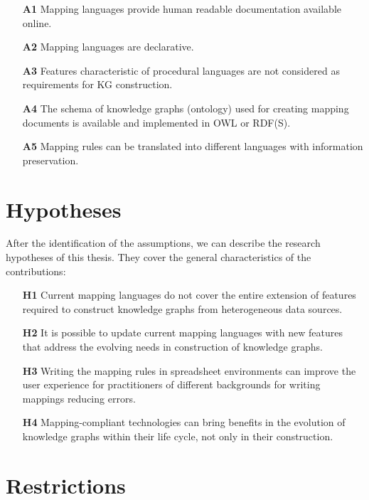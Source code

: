 \begin{enumerate}
    \item[\textbf{A1}] Mapping languages provide human readable documentation available online.
    \item[\textbf{A2}] Mapping languages are declarative.
    \item[\textbf{A3}] Features characteristic of procedural languages are not considered as requirements for KG construction. 
    \item[\textbf{A4}] The schema of knowledge graphs (ontology) used for creating mapping documents is available and implemented in OWL or RDF(S). 
    \item[\textbf{A5}] Mapping rules can be translated into different languages with information preservation.
\end{enumerate}


\section{Hypotheses}
\label{sec:chp3-hypotheses}

After the identification of the assumptions, we can describe the research hypotheses  of this thesis. They cover the general characteristics of the contributions:

\begin{enumerate}
    \item[\textbf{H1}] Current mapping languages do not cover the entire extension of features required to construct knowledge graphs from heterogeneous data sources.
    \item[\textbf{H2}] It is possible to update  current mapping languages with new features that address the evolving needs in construction of knowledge graphs.
    \item[\textbf{H3}] Writing the mapping rules in spreadsheet environments can improve the user experience for practitioners of different backgrounds for writing mappings reducing errors. 
    \item[\textbf{H4}] Mapping-compliant technologies can bring benefits in the evolution of knowledge graphs within their life cycle, not only in their construction.
\end{enumerate}


\section{Restrictions}
\label{sec:chp3-restrictions}

